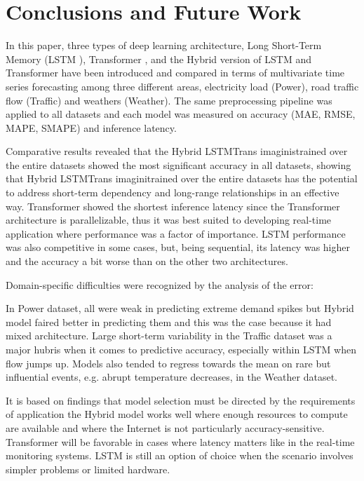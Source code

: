 \documentclass[conference]{IEEEtran}
\begin{document}
\section{Conclusions and Future Work}
In this paper, three types of deep learning architecture, Long Short-Term Memory (LSTM \cite{hochreiter1997lstm}), Transformer \cite{vaswani2017attention}, and the Hybrid \cite{wu2020deep} version of LSTM \cite{hochreiter1997lstm} and Transformer \cite{vaswani2017attention} have been introduced and compared in terms of multivariate time series forecasting among three different areas, electricity load (Power), road traffic flow (Traffic) and weathers (Weather). The same preprocessing pipeline was applied to all datasets and each model was measured on accuracy (MAE, RMSE, MAPE, SMAPE) and inference latency.

Comparative results revealed that the Hybrid \cite{wu2020deep} LSTMTrans imaginistrained over the entire datasets showed the most significant accuracy in all datasets, showing that Hybrid \cite{wu2020deep} LSTMTrans imaginitrained over the entire datasets has the potential to address short-term dependency and long-range relationships in an effective way. Transformer \cite{vaswani2017attention} showed the shortest inference latency since the Transformer \cite{vaswani2017attention} architecture is parallelizable, thus it was best suited to developing real-time application where performance was a factor of importance. LSTM \cite{hochreiter1997lstm} performance was also competitive in some cases, but, being sequential, its latency was higher and the accuracy a bit worse than on the other two architectures.

Domain-specific difficulties were recognized by the analysis of the error:

In Power dataset, all were weak in predicting extreme demand spikes but Hybrid \cite{wu2020deep} model faired better in predicting them and this was the case because it had mixed architecture. Large short-term variability in the Traffic dataset \cite{godahewa2021monash} was a major hubris when it comes to predictive accuracy, especially within LSTM \cite{hochreiter1997lstm} when flow jumps up. Models also tended to regress towards the mean on rare but influential events, e.g. abrupt temperature decreases, in the Weather dataset.

It is based on findings that model selection must be directed by the requirements of application the Hybrid \cite{wu2020deep} model works well where enough resources to compute are available and where the Internet is not particularly accuracy-sensitive. Transformer \cite{vaswani2017attention} will be favorable in cases where latency matters like in the real-time monitoring systems. LSTM \cite{hochreiter1997lstm} is still an option of choice when the scenario involves simpler problems or limited hardware.
\end{document}
